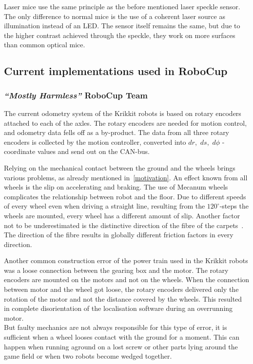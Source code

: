 \documentclass[12pt,a4paper]{article}
\newcommand{\MH}{\emph{``Mostly Harmless''} RoboCup Team\xspace}
\begin{document}
Laser mice use the same principle as the before mentioned laser speckle sensor.
The only difference to normal mice is the use of a coherent laser source as illumination instead of an LED.
The sensor itself remains the same, but due to the higher contrast achieved through the speckle, they work on more surfaces than common optical mice.

 

\subsection{Current implementations used in RoboCup}

\subsubsection{\MH}

The current odometry system of the Krikkit robots is based on rotary encoders attached to each of the axles. 
The rotary encoders are needed for motion control, and odometry data fells off as a by-product.
The data from all three rotary encoders is collected by the motion controller, converted into $dr$,~$ds$,~$d\phi$ - coordinate values and send out on the CAN-bus.

Relying on the mechanical contact between the ground and the wheels brings various problems, as already mentioned in~\autoref{motivation}.
An effect known from all wheels is the slip on accelerating and braking.
The use of Mecanum wheels complicates the relationship between robot and the floor.
Due to different speeds of every wheel even when driving a straight line, resulting from the $120^\circ$\mbox{-}steps the wheels are mounted, every wheel has a different amount of slip.
Another factor not to be underestimated is the distinctive direction of the fibre of the carpets~\cite{mecanum2007}.
The direction of the fibre results in globally different friction factors in every direction.

Another common construction error of the power train used in the Krikkit robots was a loose connection between the gearing box and the motor.
The rotary encoders are mounted on the motors and not on the wheels.
When the connection between motor and the wheel got loose, the rotary encoders delivered only the rotation of the motor and not the distance covered by the wheels. 
This resulted in complete disorientation of the localisation software during an overrunning motor.\\
But faulty mechanics are not always responsible for this type of error, it is sufficient when a wheel looses contact with the ground for a moment.
This can happen when running aground on a lost screw or other parts lying around the game field or when two robots become wedged together.
\end{document}
